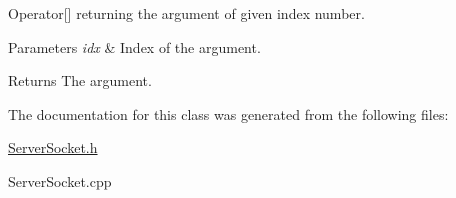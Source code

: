 Operator\mbox{[}\mbox{]} returning the argument of given index number. 


\begin{DoxyParams}{Parameters}
{\em idx} & Index of the argument. \\
\hline
\end{DoxyParams}
\begin{DoxyReturn}{Returns}
The argument. 
\end{DoxyReturn}


The documentation for this class was generated from the following files\-:\begin{DoxyCompactItemize}
\item 
\hyperlink{_server_socket_8h}{Server\-Socket.\-h}\item 
Server\-Socket.\-cpp\end{DoxyCompactItemize}
